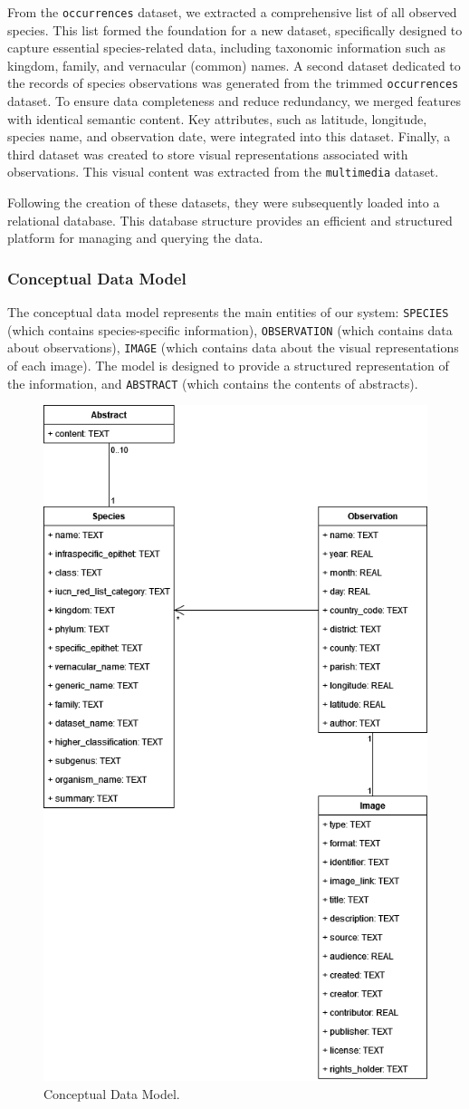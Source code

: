 From the \texttt{occurrences} dataset, we extracted a comprehensive list of all observed species. This list formed the foundation for a new dataset, specifically designed to capture essential species-related data, including taxonomic information such as kingdom, family, and vernacular (common) names. A second dataset dedicated to the records of species observations was generated from the trimmed \texttt{occurrences} dataset. To ensure data completeness and reduce redundancy, we merged features with identical semantic content. Key attributes, such as latitude, longitude, species name, and observation date, were integrated into this dataset. Finally, a third dataset was created to store visual representations associated with observations. This visual content was extracted from the \texttt{multimedia} dataset.

Following the creation of these datasets, they were subsequently loaded into a relational database. This database structure provides an efficient and structured platform for managing and querying the data.

\subsubsection{\textbf{Conceptual Data Model}}

The conceptual data model represents the main entities of our system: \texttt{SPECIES} (which contains species-specific information), \texttt{OBSERVATION} (which contains data about observations), \texttt{IMAGE} (which contains data about the visual representations of each image). The model is designed to provide a structured representation of the information, and \texttt{ABSTRACT} (which contains the contents of abstracts).

\begin{figure}[h]
  \centering
  \includegraphics[width=0.5\linewidth]{figures/conceptual_data_model.drawio.png}
  \caption{Conceptual Data Model.}
\end{figure}

